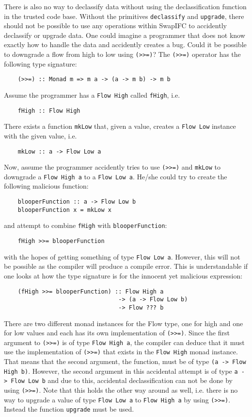 There is also no way to declassify data without using the declassification function in the trusted code base. Without the primitives {\tt declassify} and {\tt upgrade}, there should not be possible to use any operations within SwapIFC to accidently declassify or upgrade data. One could imagine a programmer that does not know exactly how to handle the data and accidently creates a bug. Could it be possible to downgrade a flow from high to low using {\tt (>>=)}? The {\tt (>>=)} operator has the following type signature:
\begin{verbatim}
    (>>=) :: Monad m => m a -> (a -> m b) -> m b
\end{verbatim}
Assume the programmer has a {\tt Flow High} called {\tt fHigh}, i.e.
\begin{verbatim}
    fHigh :: Flow High
\end{verbatim}
There exists a function {\tt mkLow} that, given a value, creates a {\tt Flow Low} instance with the given value, i.e.
\begin{verbatim}
    mkLow :: a -> Flow Low a
\end{verbatim}
Now, assume the programmer accidently tries to use {\tt (>>=)} and {\tt mkLow} to downgrade a {\tt Flow High a} to a {\tt Flow Low a}. He/she could try to create the following malicious function:
\begin{verbatim}
    blooperFunction :: a -> Flow Low b
    blooperFunction x = mkLow x
\end{verbatim}
and attempt to combine {\tt fHigh} with {\tt blooperFunction}:
\begin{verbatim}
    fHigh >>= blooperFunction
\end{verbatim}
with the hopes of getting something of type {\tt Flow Low a}. However, this will not be possible as the compiler will produce a compile error. This is understandable if one looks at how the type signature is for the innocent yet malicious expression:
\begin{verbatim}
    (fHigh >>= blooperFunction) :: Flow High a
                                 -> (a -> Flow Low b)
                                 -> Flow ??? b
\end{verbatim}
There are two different monad instances for the Flow type, one for high and one for low values and each has its own implementation of {\tt (>>=)}. Since the first argument to {\tt (>>=)} is of type {\tt Flow High a}, the compiler can deduce that it must use the implementation of {\tt (>>=)} that exists in the {\tt Flow High} monad instance. That means that the second argument, the function, must be of type {\tt (a -> Flow High b)}. However, the second argument in this accidental attempt is of type {\tt a -> Flow Low b} and due to this, accidental declassification can not be done by using {\tt (>>=)}. Note that this holds the other way around as well, i.e. there is no way to upgrade a value of type {\tt Flow Low a} to {\tt Flow High a} by using {\tt (>>=)}. Instead the function {\tt upgrade} must be used.

